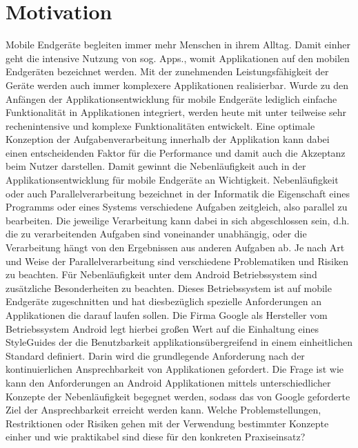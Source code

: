 \documentclass[12pt,oneside,a4paper,bibtotoc,liststotoc]{scrreprt}
\begin{document}
\section{Motivation}
Mobile Endgeräte begleiten immer mehr Menschen in ihrem Alltag. Damit einher geht die intensive Nutzung von sog. Apps., womit Applikationen auf den mobilen Endgeräten bezeichnet werden. Mit der zunehmenden Leistungsfähigkeit der Geräte werden auch immer komplexere Applikationen realisierbar. Wurde zu den Anfängen der Applikationsentwicklung für mobile Endgeräte lediglich einfache Funktionalität in Applikationen integriert, werden heute mit unter teilweise sehr rechenintensive und komplexe Funktionalitäten entwickelt. Eine optimale Konzeption der Aufgabenverarbeitung innerhalb der Applikation kann dabei einen entscheidenden Faktor für die Performance und damit auch die Akzeptanz beim Nutzer darstellen. Damit gewinnt die Nebenläufigkeit auch in der Applikationsentwicklung für mobile Endgeräte an Wichtigkeit. Nebenläufigkeit oder auch Parallelverarbeitung bezeichnet in der Informatik die Eigenschaft eines Programms oder eines Systems verschiedene Aufgaben zeitgleich, also parallel zu bearbeiten. Die jeweilige Verarbeitung kann dabei in sich abgeschlossen sein, d.h. die zu verarbeitenden Aufgaben sind voneinander unabhängig, oder die Verarbeitung hängt von den Ergebnissen aus anderen Aufgaben ab. Je nach Art und Weise der Parallelverarbeitung sind verschiedene Problematiken und Risiken zu beachten. Für Nebenläufigkeit unter dem Android Betriebssystem sind zusätzliche Besonderheiten zu beachten. Dieses Betriebssystem ist auf mobile Endgeräte zugeschnitten und hat diesbezüglich spezielle Anforderungen an Applikationen die darauf laufen sollen. Die Firma Google als Hersteller vom Betriebssystem Android legt hierbei großen Wert auf die Einhaltung eines StyleGuides der die Benutzbarkeit applikationsübergreifend in einem einheitlichen Standard definiert. Darin wird die grundlegende Anforderung nach der kontinuierlichen Ansprechbarkeit von Applikationen gefordert. Die Frage ist wie kann den Anforderungen an Android Applikationen mittels unterschiedlicher Konzepte der Nebenläufigkeit begegnet werden, sodass das von Google geforderte Ziel der Ansprechbarkeit erreicht werden kann. Welche Problemstellungen, Restriktionen oder Risiken gehen mit der Verwendung bestimmter Konzepte einher und wie praktikabel sind diese für den konkreten Praxiseinsatz? 
\end{document}
